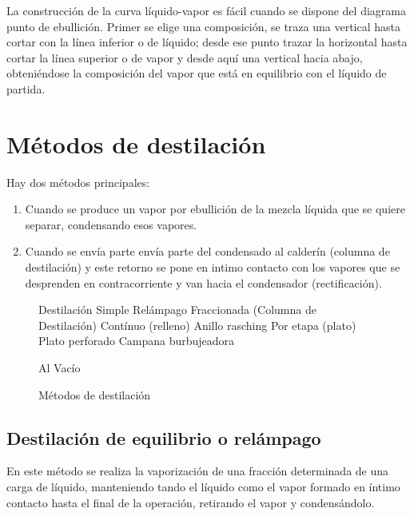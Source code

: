 \documentclass[11pt,openany]{book}
\begin{document}
La construcción de la curva líquido-vapor es fácil cuando se dispone del diagrama punto de
 ebullición. Primer se elige una composición, se traza una vertical hasta 
 cortar con la línea inferior o de líquido; desde ese punto trazar la horizontal hasta cortar la línea 
 superior o de vapor y desde aquí una vertical hacia abajo, obteniéndose la composición del vapor 
 que está en equilibrio con el líquido de partida.

 \section{Métodos de destilación}

 Hay dos métodos principales:
 \begin{enumerate}
 \item Cuando se produce un vapor por ebullición de la mezcla líquida que se quiere separar, condensando esos vapores.
 \item Cuando se envía parte envía parte del condensado al calderín (columna de destilación) y este retorno 
 se pone en intimo contacto con los vapores que se desprenden en contracorriente y van hacia el condensador (rectificación).
 \end{enumerate}

 \begin{figure}
  \tree Destilación
  \subtree Simple \endsubtree
  \subtree Relámpago \endsubtree
  \subtree Fraccionada
       (Columna de
        Destilación) 
          \subtree Contínuo
           (relleno) 
          \subtree Anillo 
          rasching \endsubtree
          \endsubtree
          \subtree Por etapa
           (plato) 
          \subtree Plato 
          perforado \endsubtree
          \subtree Campana
           burbujeadora \endsubtree
          \endsubtree
      
  \endsubtree
  \subtree
  Al Vacío
  \endsubtree
  \endtree
  \caption{Métodos de destilación}
  \end{figure}
  
\subsection {Destilación de equilibrio o relámpago}

En este método se realiza la vaporización de una fracción determinada de una carga de líquido,
manteniendo tando el líquido como el vapor formado en íntimo contacto hasta el final de la 
operación, retirando el vapor y condensándolo.
\end{document}
